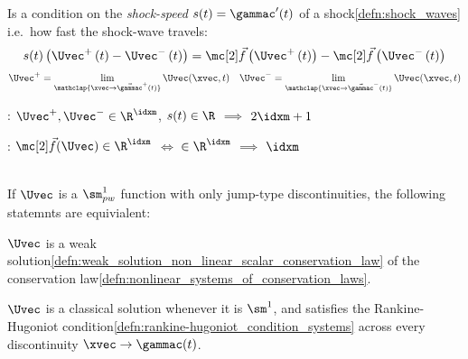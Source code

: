 \begin{defnbox}\nospacing
    \begin{defn}\label{defn:rankine-hugoniot_condition_systems}
        Is a condition on the \textit{shock-speed} $s(t)=\gammac'(t)$ of a shock\cref{defn:shock_waves} i.e.\ how fast the shock-wave travels:
        \begin{align}
          s(t)\left(\Uvec^{+}\left(t\right)-\Uvec^{-}\left(t\right)\right)=\fluxvec\left(\Uvec^{+}\left(t\right)\right)-\fluxvec\left(\Uvec^{-}\left(t\right)\right)
          \label{eq:rankine-hugoniot_condition_systems}
        \end{align}
        \begin{align*}
          \Uvec^{+}=\lim_{\mathclap{\xvec\to\vec{\gammac}^{+}(t)}}\Uvec(\xvec,t)&&\Uvec^{-}=\lim_{\mathclap{\xvec\to\vec{\gammac}^{-}(t)}}\Uvec(\xvec,t)
        \end{align*}
    \end{defn}
\end{defnbox}
\begin{corbox}\nospacing
    \begin{cor}\label{cor:unknowns_vs._equations}\leavevmode
        \begin{itemizenosep}
            \item {}: $\Uvec^{+},\Uvec^{-}\in\R^{\idxm}$, $s(t)\in\R$ $\implies$ $2\idxm+1$
            \item {}: $\fluxvec(\Uvec)\in\R^{\idxm}$ $\iff$ $\in\R^{\idxm}$ $\implies$ $\idxm$
        \end{itemizenosep}
    \end{cor}
\end{corbox}
\begin{corbox}\nospacing
    \begin{cor}\label{cor:relationship_to_weak_solutions}\leavevmode\\
        If $\Uvec$ is a $\sm_{pw}^{1}$ function with only jump-type discontinuities, the following statemnts are equivialent:
        \begin{itemizenosep}
            \item $\Uvec$ is a weak solution\cref{defn:weak_solution_non_linear_scalar_conservation_law} of the conservation law\cref{defn:nonlinear_systems_of_conservation_laws}.
            \item $\Uvec$ is a classical solution whenever it is $\sm^{1}$, and satisfies the Rankine-Hugoniot condition\cref{defn:rankine-hugoniot_condition_systems}
            across every discontinuity $\xvec\to\gammac(t)$.
        \end{itemizenosep}
    \end{cor}
\end{corbox}
